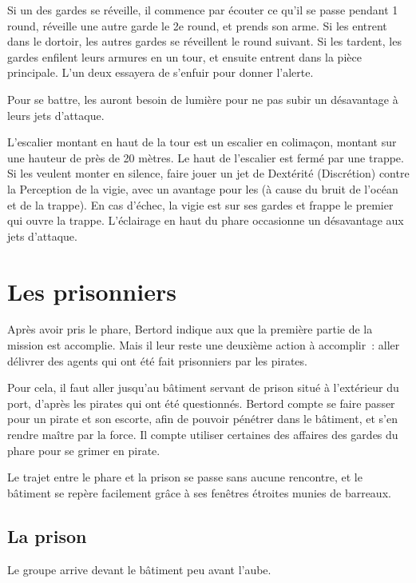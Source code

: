 \documentclass[a4paper,10pt,openany]{book}
\begin{document}
\begin{multicols}{2}
\begin{quotebox}
	Si un des gardes se réveille, il commence par écouter ce qu’il se passe pendant 1 round, réveille une autre garde le 2e round, et prends son arme. Si
	les \PJs entrent dans le dortoir, les autres gardes se réveillent le round suivant. Si les \PJs tardent, les gardes enfilent leurs
	armures en un tour, et ensuite entrent dans la pièce principale. L’un deux essayera de s’enfuir pour donner l’alerte.
\end{quotebox}

Pour se battre, les \PJs auront besoin de lumière pour ne pas subir un désavantage à leurs jets d’attaque.\par L’escalier montant en haut de la
tour est un escalier en colimaçon, montant sur une hauteur de près de 20 mètres. Le haut de l’escalier est fermé par une trappe. Si les \PJs
veulent monter en silence, faire jouer un jet de Dextérité (Discrétion) contre la Perception de la vigie, avec un avantage pour les \PJs (à cause du
bruit de l’océan et de la trappe). En cas d’échec, la vigie est sur ses gardes et frappe le premier qui ouvre la trappe. L’éclairage en haut du phare
occasionne un désavantage aux jets d’attaque.

\section{Les prisonniers}
Après avoir pris le phare, Bertord indique aux \PJs que la première partie de la mission est accomplie. Mais il leur reste une deuxième action
à accomplir : aller délivrer des agents qui ont été fait prisonniers par les pirates.\par Pour cela, il faut aller jusqu’au bâtiment servant de prison
situé à l’extérieur du port, d’après les pirates qui ont été questionnés. Bertord compte se faire passer pour un pirate et son escorte, afin de
pouvoir pénétrer dans le bâtiment, et s’en rendre maître par la force. Il compte utiliser certaines des affaires des gardes du phare pour se grimer en
pirate.\par Le trajet entre le phare et la prison se passe sans aucune rencontre, et le bâtiment se repère facilement grâce à ses fenêtres étroites
munies de barreaux.

\subsection{La prison}
Le groupe arrive devant le bâtiment peu avant l’aube.


\end{multicols}
\end{document}
